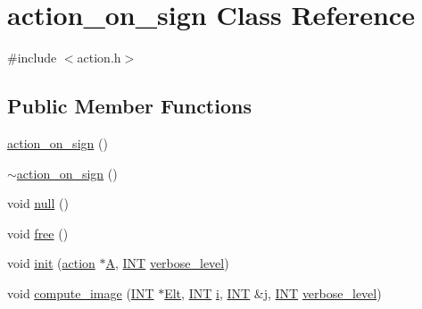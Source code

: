 \hypertarget{classaction__on__sign}{}\section{action\+\_\+on\+\_\+sign Class Reference}
\label{classaction__on__sign}


{\ttfamily \#include $<$action.\+h$>$}

\subsection*{Public Member Functions}
\begin{DoxyCompactItemize}
\item 
\mbox{\hyperlink{classaction__on__sign_a846a035f98356d2ac35b8d9b85534433}{action\+\_\+on\+\_\+sign}} ()
\item 
\mbox{\hyperlink{classaction__on__sign_a64412ea8878684dc7d116d7f43a41041}{$\sim$action\+\_\+on\+\_\+sign}} ()
\item 
void \mbox{\hyperlink{classaction__on__sign_a5d4ddce55e1367a05e6f3742b3a40773}{null}} ()
\item 
void \mbox{\hyperlink{classaction__on__sign_a2158c217f42a01fe231276a5c5370ad2}{free}} ()
\item 
void \mbox{\hyperlink{classaction__on__sign_a06c3795c6edc281073c17807c6f318cd}{init}} (\mbox{\hyperlink{classaction}{action}} $\ast$\mbox{\hyperlink{classaction__on__sign_a281ba8bac580733b5e6515a5603cd2c8}{A}}, \mbox{\hyperlink{galois_8h_a09fddde158a3a20bd2dcadb609de11dc}{I\+NT}} \mbox{\hyperlink{simeon_8_c_a818073fbcc2f439e7c56952f67386122}{verbose\+\_\+level}})
\item 
void \mbox{\hyperlink{classaction__on__sign_a50a03ddd12e5619d59aee3de0fb5930e}{compute\+\_\+image}} (\mbox{\hyperlink{galois_8h_a09fddde158a3a20bd2dcadb609de11dc}{I\+NT}} $\ast$\mbox{\hyperlink{simeon_8_c_aec1406935bdb1fee3561fcb840964100}{Elt}}, \mbox{\hyperlink{galois_8h_a09fddde158a3a20bd2dcadb609de11dc}{I\+NT}} \mbox{\hyperlink{alphabet2_8_c_acb559820d9ca11295b4500f179ef6392}{i}}, \mbox{\hyperlink{galois_8h_a09fddde158a3a20bd2dcadb609de11dc}{I\+NT}} \&\mbox{\hyperlink{alphabet2_8_c_a37d972ae0b47b9099e30983131d31916}{j}}, \mbox{\hyperlink{galois_8h_a09fddde158a3a20bd2dcadb609de11dc}{I\+NT}} \mbox{\hyperlink{simeon_8_c_a818073fbcc2f439e7c56952f67386122}{verbose\+\_\+level}})
\end{DoxyCompactItemize}
